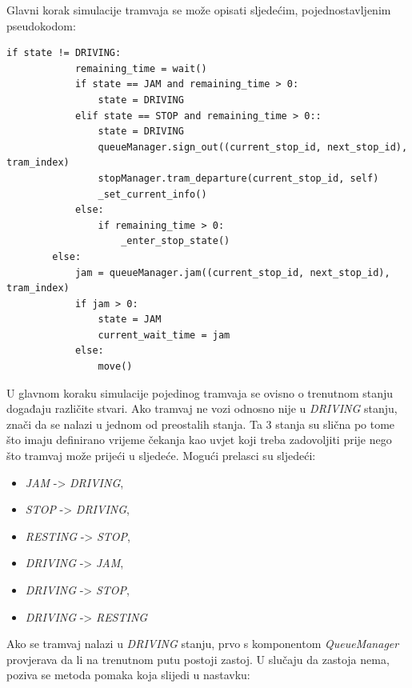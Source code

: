 \documentclass[times, utf8, diplomski]{fer}
\begin{document}
Glavni korak simulacije tramvaja se može opisati sljedećim, pojednostavljenim pseudokodom:

\begin{lstlisting}[caption={Glavni korak u simulaciju tramvaja},captionpos=b,label={kod:tram_main}]
    if state != DRIVING:
            remaining_time = wait()
            if state == JAM and remaining_time > 0:
                state = DRIVING
            elif state == STOP and remaining_time > 0::
                state = DRIVING
                queueManager.sign_out((current_stop_id, next_stop_id), tram_index)
                stopManager.tram_departure(current_stop_id, self)
                _set_current_info()
            else:
                if remaining_time > 0:
                    _enter_stop_state()
        else:
            jam = queueManager.jam((current_stop_id, next_stop_id), tram_index)
            if jam > 0:
                state = JAM
                current_wait_time = jam
            else:
                move()
\end{lstlisting}

U glavnom koraku simulacije pojedinog tramvaja se ovisno o trenutnom stanju događaju različite stvari. Ako tramvaj ne vozi odnosno nije u \emph{DRIVING} stanju, znači da se nalazi u jednom od preostalih stanja. Ta 3 stanja su slična po tome što imaju definirano vrijeme čekanja kao uvjet koji treba zadovoljiti prije nego što tramvaj može prijeći u sljedeće. Mogući prelasci su sljedeći:
\begin{itemize}
    \item \emph{JAM} -> \emph{DRIVING},
    \item \emph{STOP} -> \emph{DRIVING},
    \item \emph{RESTING} -> \emph{STOP},
    \item \emph{DRIVING} -> \emph{JAM},
    \item \emph{DRIVING} -> \emph{STOP},
    \item \emph{DRIVING} -> \emph{RESTING}
\end{itemize}

Ako se tramvaj nalazi u \emph{DRIVING} stanju, prvo s komponentom \emph{QueueManager} provjerava da li na trenutnom putu postoji zastoj. U slučaju da zastoja nema, poziva se metoda pomaka koja slijedi u nastavku:
\end{document}
